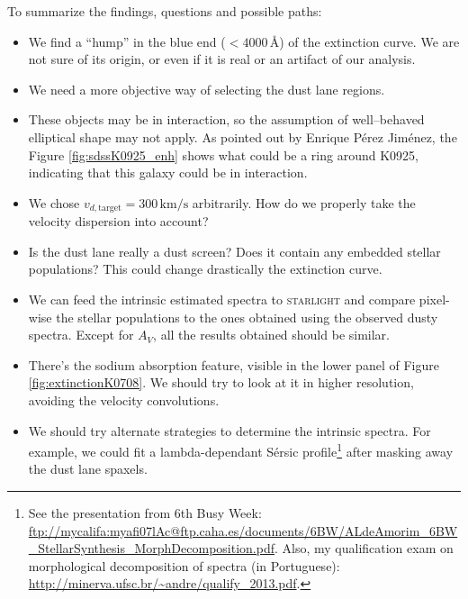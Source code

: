 \documentclass[a4paper]{article}
\newcommand{\angstrom}{\text{\AA}}
\def\starlight{\textsc{starlight}\xspace}
\begin{document}
To summarize the findings, questions and possible paths:

\begin{itemize} 

\item We find a ``hump'' in the blue end ($< 4000\,\angstrom$) of the extinction
curve. We are not sure of its origin, or even if it is real or an artifact of
our analysis.

\item We need a more objective way of selecting the dust lane regions.

\item These objects may be in interaction, so the assumption of well--behaved
elliptical shape may not apply. As pointed out by Enrique Pérez Jiménez, the
Figure \ref{fig:sdssK0925_enh} shows what could be a ring around K0925,
indicating that this galaxy could be in interaction.

\item We chose $v_{d,\text{target}} = 300\,\mathrm{km/s}$
  arbitrarily. How do we properly take the velocity dispersion into
  account?

\item Is the dust lane really a dust screen? Does it contain any embedded
stellar populations? This could change drastically the extinction curve.

\item We can feed the intrinsic estimated spectra to \starlight and compare
pixel-wise the stellar populations to the ones obtained using the observed dusty spectra.
Except for $A_V$, all the results obtained should be similar.

\item There's the sodium absorption feature, visible in the lower panel of
Figure \ref{fig:extinctionK0708}. We should try to look at it in higher resolution,
avoiding the velocity convolutions.

\item We should try alternate strategies to determine the intrinsic spectra. For
example, we could fit a lambda-dependant Sérsic profile\footnote{See the
presentation from 6th Busy Week:
\url{ftp://mycalifa:myafi07lAc@ftp.caha.es/documents/6BW/ALdeAmorim_6BW_StellarSynthesis_MorphDecomposition.pdf}.
Also, my qualification exam on morphological decomposition of spectra (in
Portuguese):
\url{http://minerva.ufsc.br/~andre/qualify_2013.pdf}.} after masking away the
dust lane spaxels.

\end{itemize}
\end{document}
